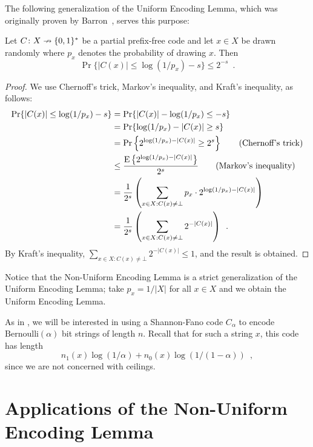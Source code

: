 \documentclass{patmorin}
\begin{document}
The following generalization of the Uniform Encoding Lemma, which was
originally proven by Barron~\cite[Theorem~3.1]{barron:dissertation},
serves this purpose:
\begin{lem}  
  Let $C\colon X\nrightarrow\{0,1\}^*$ be a partial prefix-free code and let
  $x\in X$ be drawn randomly where $p_x$ denotes the probability of
  drawing $x$.  Then 
  \[
  \Pr\{ |C(x)| \le \log(1/p_x)-s\} \le 2^{-s} \enspace .
  \]
\end{lem}

\begin{proof}
  We use Chernoff's trick, Markov's inequality, and Kraft's inequality,
  as follows: 
  \begin{align*}
    \Pr\{ |C(x)| \le\log(1/p_x)-s \}
    & = \Pr\{|C(x)| -\log(1/p_x) \le -s \} \\
    & = \Pr\{\log(1/p_x)-|C(x)| \ge s \} \\
    & = \Pr\left\{2^{\log(1/p_x)-|C(x)|} \ge 2^s \right\}  \tag{Chernoff's trick} \\
    & \le \frac{\operatorname{\mathrm{E}}\left\{2^{\log(1/p_x)-|C(x)|}\right\}}{2^s} \tag{Markov's inequality} \\
    & = \frac{1}{2^s} \left(\sum_{x\in X : C(x) \neq \bot} p_x\cdot 2^{\log(1/p_x)-|C(x)|}\right) \\
    & = \frac{1}{2^s} \left(\sum_{x\in X : C(x) \neq \bot }2^{-|C(x)|}\right) \enspace .
  \end{align*}
  By Kraft's inequality, $\sum_{x \in X : C(x) \neq \bot} 2^{-|C(x)|} \leq 1$, and the result is obtained.
\end{proof}

Notice that the Non-Uniform Encoding Lemma is a strict generalization
of the Uniform Encoding Lemma; take $p_x=1/|X|$ for all $x\in X$
and we obtain the Uniform Encoding Lemma.

As in , we will be interested in using a
Shannon-Fano code $C_\alpha$ to encode $\mathrm{Bernoulli}(\alpha)$ bit strings of
length $n$. Recall that for such a string $x$, this code has length
\[
n_1(x) \log (1/\alpha) + n_0(x) \log(1/(1 - \alpha)) \enspace ,
\]
since we are not concerned with ceilings.

\section{Applications of the Non-Uniform Encoding Lemma}
\end{document}
